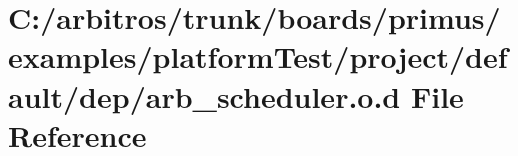 \hypertarget{platform_test_2project_2default_2dep_2arb__scheduler_8o_8d}{\section{C\-:/arbitros/trunk/boards/primus/examples/platform\-Test/project/default/dep/arb\-\_\-scheduler.o.\-d File Reference}
\label{platform_test_2project_2default_2dep_2arb__scheduler_8o_8d}
}
